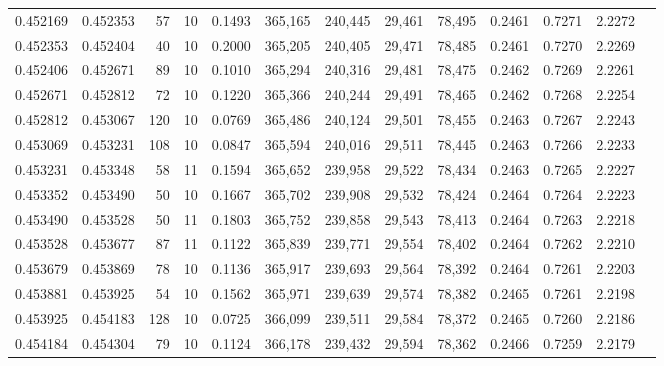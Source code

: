 \begin{tabular}{rrrrrrrrrrrrr}
0.452169 & 0.452353 &    57 &  10 &                                     0.1493 & 365,165 & 240,445 &  29,461 &  78,495 & 0.2461 & 0.7271 & 2.2272 \\
0.452353 & 0.452404 &    40 &  10 &                                     0.2000 & 365,205 & 240,405 &  29,471 &  78,485 & 0.2461 & 0.7270 & 2.2269 \\
0.452406 & 0.452671 &    89 &  10 &                                     0.1010 & 365,294 & 240,316 &  29,481 &  78,475 & 0.2462 & 0.7269 & 2.2261 \\
0.452671 & 0.452812 &    72 &  10 &                                     0.1220 & 365,366 & 240,244 &  29,491 &  78,465 & 0.2462 & 0.7268 & 2.2254 \\
0.452812 & 0.453067 &   120 &  10 &                                     0.0769 & 365,486 & 240,124 &  29,501 &  78,455 & 0.2463 & 0.7267 & 2.2243 \\
0.453069 & 0.453231 &   108 &  10 &                                     0.0847 & 365,594 & 240,016 &  29,511 &  78,445 & 0.2463 & 0.7266 & 2.2233 \\
0.453231 & 0.453348 &    58 &  11 &                                     0.1594 & 365,652 & 239,958 &  29,522 &  78,434 & 0.2463 & 0.7265 & 2.2227 \\
0.453352 & 0.453490 &    50 &  10 &                                     0.1667 & 365,702 & 239,908 &  29,532 &  78,424 & 0.2464 & 0.7264 & 2.2223 \\
0.453490 & 0.453528 &    50 &  11 &                                     0.1803 & 365,752 & 239,858 &  29,543 &  78,413 & 0.2464 & 0.7263 & 2.2218 \\
0.453528 & 0.453677 &    87 &  11 &                                     0.1122 & 365,839 & 239,771 &  29,554 &  78,402 & 0.2464 & 0.7262 & 2.2210 \\
0.453679 & 0.453869 &    78 &  10 &                                     0.1136 & 365,917 & 239,693 &  29,564 &  78,392 & 0.2464 & 0.7261 & 2.2203 \\
0.453881 & 0.453925 &    54 &  10 &                                     0.1562 & 365,971 & 239,639 &  29,574 &  78,382 & 0.2465 & 0.7261 & 2.2198 \\
0.453925 & 0.454183 &   128 &  10 &                                     0.0725 & 366,099 & 239,511 &  29,584 &  78,372 & 0.2465 & 0.7260 & 2.2186 \\
0.454184 & 0.454304 &    79 &  10 &                                     0.1124 & 366,178 & 239,432 &  29,594 &  78,362 & 0.2466 & 0.7259 & 2.2179 \\

\end{tabular}
